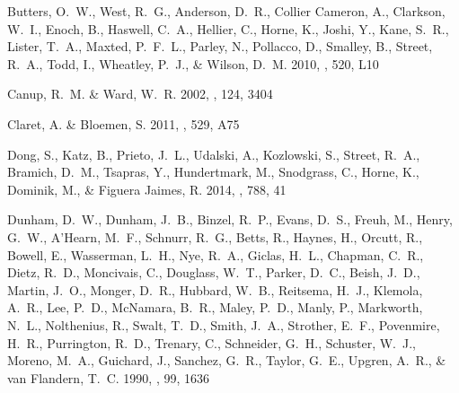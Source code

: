 \documentclass{emulateapj}
\begin{document}
\begin{thebibliography}{45}
{Butters}, O.~W., {West}, R.~G., {Anderson}, D.~R., {Collier Cameron}, A.,
  {Clarkson}, W.~I., {Enoch}, B., {Haswell}, C.~A., {Hellier}, C., {Horne}, K.,
  {Joshi}, Y., {Kane}, S.~R., {Lister}, T.~A., {Maxted}, P.~F.~L., {Parley},
  N., {Pollacco}, D., {Smalley}, B., {Street}, R.~A., {Todd}, I., {Wheatley},
  P.~J., \& {Wilson}, D.~M. 2010, \aap, 520, L10

{Canup}, R.~M. \& {Ward}, W.~R. 2002, \aj, 124, 3404

{Claret}, A. \& {Bloemen}, S. 2011, \aap, 529, A75

{Dong}, S., {Katz}, B., {Prieto}, J.~L., {Udalski}, A., {Kozlowski}, S.,
  {Street}, R.~A., {Bramich}, D.~M., {Tsapras}, Y., {Hundertmark}, M.,
  {Snodgrass}, C., {Horne}, K., {Dominik}, M., \& {Figuera Jaimes}, R. 2014,
  \apj, 788, 41

{Dunham}, D.~W., {Dunham}, J.~B., {Binzel}, R.~P., {Evans}, D.~S., {Freuh}, M.,
  {Henry}, G.~W., {A'Hearn}, M.~F., {Schnurr}, R.~G., {Betts}, R., {Haynes},
  H., {Orcutt}, R., {Bowell}, E., {Wasserman}, L.~H., {Nye}, R.~A., {Giclas},
  H.~L., {Chapman}, C.~R., {Dietz}, R.~D., {Moncivais}, C., {Douglass}, W.~T.,
  {Parker}, D.~C., {Beish}, J.~D., {Martin}, J.~O., {Monger}, D.~R., {Hubbard},
  W.~B., {Reitsema}, H.~J., {Klemola}, A.~R., {Lee}, P.~D., {McNamara}, B.~R.,
  {Maley}, P.~D., {Manly}, P., {Markworth}, N.~L., {Nolthenius}, R., {Swalt},
  T.~D., {Smith}, J.~A., {Strother}, E.~F., {Povenmire}, H.~R., {Purrington},
  R.~D., {Trenary}, C., {Schneider}, G.~H., {Schuster}, W.~J., {Moreno}, M.~A.,
  {Guichard}, J., {Sanchez}, G.~R., {Taylor}, G.~E., {Upgren}, A.~R., \& {van
  Flandern}, T.~C. 1990, \aj, 99, 1636


\end{thebibliography}
\end{document}
